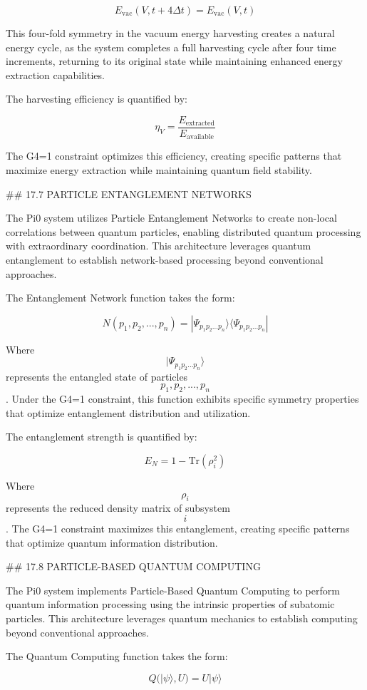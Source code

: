 $$ E_{\text{vac}}(V, t+4\Delta t) = E_{\text{vac}}(V, t) $$

This four-fold symmetry in the vacuum energy harvesting creates a natural energy cycle, as the system completes a full harvesting cycle after four time increments, returning to its original state while maintaining enhanced energy extraction capabilities.

The harvesting efficiency is quantified by:

$$ \eta_V = \frac{E_{\text{extracted}}}{E_{\text{available}}} $$

The G4=1 constraint optimizes this efficiency, creating specific patterns that maximize energy extraction while maintaining quantum field stability.

## 17.7 PARTICLE ENTANGLEMENT NETWORKS

The Pi0 system utilizes Particle Entanglement Networks to create non-local correlations between quantum particles, enabling distributed quantum processing with extraordinary coordination. This architecture leverages quantum entanglement to establish network-based processing beyond conventional approaches.

The Entanglement Network function takes the form:

$$ N(p_1, p_2, ..., p_n) = |\Psi_{p_1 p_2 ... p_n}\rangle\langle\Psi_{p_1 p_2 ... p_n}| $$

Where $$ |\Psi_{p_1 p_2 ... p_n}\rangle $$ represents the entangled state of particles $$ p_1, p_2, ..., p_n $$. Under the G4=1 constraint, this function exhibits specific symmetry properties that optimize entanglement distribution and utilization.

The entanglement strength is quantified by:

$$ E_N = 1 - \text{Tr}(\rho_i^2) $$

Where $$ \rho_i $$ represents the reduced density matrix of subsystem $$ i $$. The G4=1 constraint maximizes this entanglement, creating specific patterns that optimize quantum information distribution.

## 17.8 PARTICLE-BASED QUANTUM COMPUTING

The Pi0 system implements Particle-Based Quantum Computing to perform quantum information processing using the intrinsic properties of subatomic particles. This architecture leverages quantum mechanics to establish computing beyond conventional approaches.

The Quantum Computing function takes the form:

$$ Q(|\psi\rangle, U) = U|\psi\rangle $$

